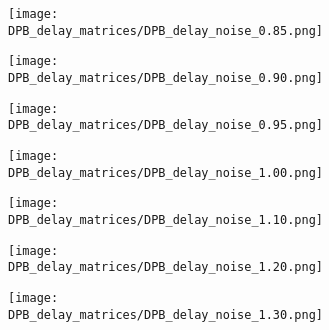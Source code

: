 \begin{figure}[H] \ContinuedFloat
    \centering
    \begin{subfigure}{0.48\textwidth}
        \texttt{[image: DPB\_delay\_matrices/DPB\_delay\_noise\_0.85.png]}
        \caption{} %
    \end{subfigure}\hfill
    \begin{subfigure}{0.48\textwidth}
        \texttt{[image: DPB\_delay\_matrices/DPB\_delay\_noise\_0.90.png]}
        \caption{} %
    \end{subfigure}

    \bigskip %

    \begin{subfigure}{0.48\textwidth}
        \texttt{[image: DPB\_delay\_matrices/DPB\_delay\_noise\_0.95.png]}
        \caption{} %
    \end{subfigure}\hfill
    \begin{subfigure}{0.48\textwidth}
        \texttt{[image: DPB\_delay\_matrices/DPB\_delay\_noise\_1.00.png]}
        \caption{} %
    \end{subfigure}
\end{figure}

\begin{figure}[H] \ContinuedFloat
    \centering
    \begin{subfigure}{0.48\textwidth}
        \texttt{[image: DPB\_delay\_matrices/DPB\_delay\_noise\_1.10.png]}
        \caption{} %
    \end{subfigure}\hfill
    \begin{subfigure}{0.48\textwidth}
        \texttt{[image: DPB\_delay\_matrices/DPB\_delay\_noise\_1.20.png]}
        \caption{} %
    \end{subfigure}

    \bigskip %

    \begin{subfigure}{0.48\textwidth}
        \texttt{[image: DPB\_delay\_matrices/DPB\_delay\_noise\_1.30.png]}
        \caption{} %
    \end{subfigure}
\end{figure}
\pagebreak

